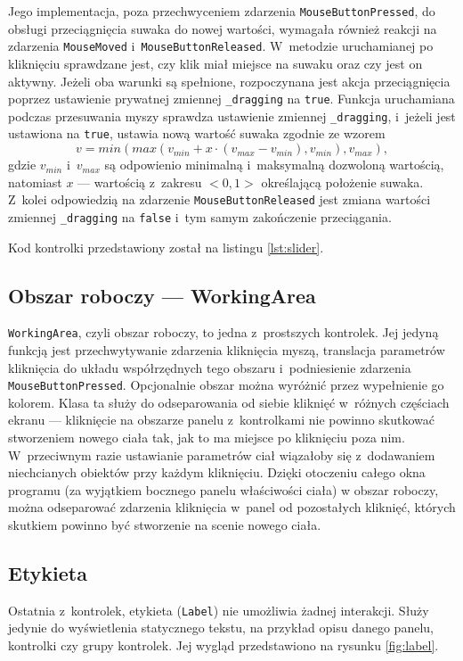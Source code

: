 Jego implementacja, poza przechwyceniem zdarzenia \verb|MouseButtonPressed|, do obsługi przeciągnięcia suwaka do nowej wartości, wymagała również reakcji na zdarzenia \verb|MouseMoved| i~\verb|MouseButtonReleased|. W~metodzie uruchamianej po kliknięciu sprawdzane jest, czy klik miał miejsce na suwaku oraz czy jest on aktywny. Jeżeli oba warunki są spełnione, rozpoczynana jest akcja przeciągnięcia poprzez ustawienie prywatnej zmiennej \verb|_dragging| na \verb|true|. Funkcja uruchamiana podczas przesuwania myszy sprawdza ustawienie zmiennej \verb|_dragging|, i~jeżeli jest ustawiona na \verb|true|, ustawia nową wartość suwaka zgodnie ze wzorem 
\begin{equation}
v = min (  max(v_{min} + x \cdot (v_{max} - v_{min}),v_{min}), v_{max}),
\end{equation}
gdzie $v_{min}$ i~$v_{max}$ są odpowienio minimalną i~maksymalną dozwoloną wartością, natomiast $x$ --- wartością z~zakresu $<0,1>$ określającą położenie suwaka.
Z~kolei odpowiedzią na zdarzenie \verb|MouseButtonReleased| jest zmiana wartości zmiennej \verb|_dragging| na \verb|false| i~tym samym zakończenie przeciągania.

Kod kontrolki przedstawiony został na listingu \ref{lst:slider}.
\subsection{Obszar roboczy --- WorkingArea}
\verb|WorkingArea|, czyli obszar roboczy, to jedna z~prostszych kontrolek. Jej jedyną funkcją jest przechwytywanie zdarzenia kliknięcia myszą, translacja parametrów kliknięcia do układu współrzędnych tego obszaru i~podniesienie zdarzenia \verb|MouseButtonPressed|.  Opcjonalnie obszar można wyróżnić przez wypełnienie go kolorem. Klasa ta służy do odseparowania od siebie kliknięć w~różnych częściach ekranu --- kliknięcie na obszarze panelu z~kontrolkami nie powinno skutkować stworzeniem nowego ciała tak, jak to ma miejsce po kliknięciu poza nim. W~przeciwnym razie ustawianie parametrów ciał wiązałoby się z~dodawaniem niechcianych obiektów przy każdym kliknięciu. Dzięki otoczeniu całego okna programu (za wyjątkiem bocznego panelu właściwości ciała) w obszar roboczy, można odseparować zdarzenia kliknięcia w~panel od pozostałych kliknięć, których skutkiem powinno być stworzenie na scenie nowego ciała.

\subsection{Etykieta}
Ostatnia z~kontrolek, etykieta (\verb|Label|) nie umożliwia żadnej interakcji. Służy jedynie do wyświetlenia statycznego tekstu, na przykład opisu danego panelu, kontrolki czy grupy kontrolek. Jej wygląd przedstawiono na rysunku \ref{fig:label}.

